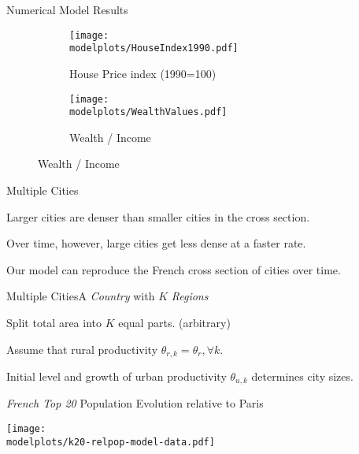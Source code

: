 \documentclass[aspectratio=169]{beamer}
\begin{document}
\begin{frame}{Numerical Model Results}

	\begin{figure}
		\begin{subfigure}[t]{0.5\textwidth}
			\centering
			\texttt{[image: \\modelplots/HouseIndex1990.pdf]}
			\caption{House Price index (1990=100)}
		\end{subfigure}\hfill
		\begin{subfigure}[t]{0.5\textwidth}
			\centering
			\texttt{[image: \\modelplots/WealthValues.pdf]}
			\caption{Wealth / Income}
		\end{subfigure}
	\end{figure}
	
\end{frame}

\begin{frame}{Multiple Cities}

\begin{midi}
\item Larger cities are denser than smaller cities in the cross section.
\item Over time, however, large cities get less dense at a faster rate.
\item Our model can reproduce the French cross section of cities over time.

\end{midi}
\end{frame}

\begin{frame}{Multiple Cities}{A \emph{Country} with $K$ \emph{Regions}}
\begin{widei}
\item Split total area into $K$ equal parts. (arbitrary)
\item Assume that rural productivity $\theta_{r,k}=\theta_{r}, \forall k$.
\item Initial level and growth of urban productivity $\theta_{u,k}$ determines city sizes.

\end{widei}
\end{frame}

\begin{frame}{\emph{French Top 20} Population Evolution relative to Paris}

	\begin{adjustbox}{center}
		\texttt{[image: \\modelplots/k20-relpop-model-data.pdf]}
	\end{adjustbox}


\end{frame}
\end{document}
